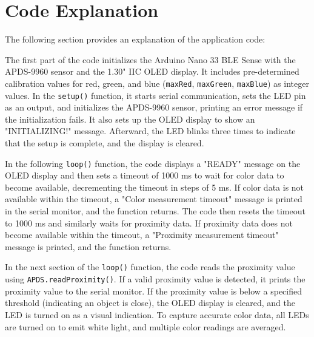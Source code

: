 \section{Code Explanation}

The following section provides an explanation of the application code:

\smallskip

The first part of the code initializes the Arduino Nano 33 BLE Sense with the APDS-9960 sensor and the 1.30" IIC OLED display. It includes pre-determined calibration values for red, green, and blue (\texttt{maxRed}, \texttt{maxGreen}, \texttt{maxBlue}) as integer values. In the \texttt{setup()} function, it starts serial communication, sets the LED pin as an output, and initializes the APDS-9960 sensor, printing an error message if the initialization fails. It also sets up the OLED display to show an "INITIALIZING!" message. Afterward, the LED blinks three times to indicate that the setup is complete, and the display is cleared.

{
	\label{AppAPDS9960Header}
}


In the following \texttt{loop()} function, the code displays a "READY" message on the OLED display and then sets a timeout of 1000 ms to wait for color data to become available, decrementing the timeout in steps of 5 ms. If color data is not available within the timeout, a "Color measurement timeout" message is printed in the serial monitor, and the function returns. The code then resets the timeout to 1000 ms and similarly waits for proximity data. If proximity data does not become available within the timeout, a "Proximity measurement timeout" message is printed, and the function returns.

{
	\label{AppAPDS9960Loop}
}


In the next section of the \texttt{loop()} function, the code reads the proximity value using \texttt{APDS.readProximity()}. If a valid proximity value is detected, it prints the proximity value to the serial monitor. If the proximity value is below a specified threshold (indicating an object is close), the OLED display is cleared, and the LED is turned on as a visual indication. To capture accurate color data, all LEDs are turned on to emit white light, and multiple color readings are averaged.

